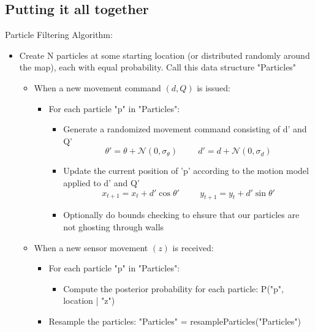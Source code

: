 \documentclass[10pt]{article}
\begin{document}
\subsection*{Putting it all together}
Particle Filtering Algorithm:
\begin{itemize}
	\item Create N particles at some starting location (or distributed randomly around the map), each with equal probability.  Call this data structure "Particles"
	\begin{itemize}
        \item When a new movement command $(d, Q)$ is issued:
        \begin{itemize}
            \item For each particle "p" in "Particles":
            \begin{itemize}
                \item Generate a randomized movement command consisting of d' and Q'
                \[\theta' = \theta + \mathcal{N}(0, \sigma_\theta) \hspace{1cm} d' = d + \mathcal{N}(0, \sigma_d)\]
                \item Update the current position of 'p' according to the motion model applied to d' and Q'
                \[x_{t + 1} = x_t + d' \cos \theta' \hspace{1cm} y_{t + 1} = y_t + d' \sin \theta'\]
                \item Optionally do bounds checking to ehsure that our particles are not ghosting through walls
            \end{itemize}
        \end{itemize}
        \item When a new sensor movement $(z)$ is received:
        \begin{itemize}
            \item For each particle "p" in "Particles":
            \begin{itemize}
                \item Compute the posterior probability for each particle: P("p", location | "z")
            \end{itemize}
            \item Resample the particles: "Particles" = resampleParticles("Particles")
        \end{itemize}
    \end{itemize}
\end{itemize}
\end{document}
